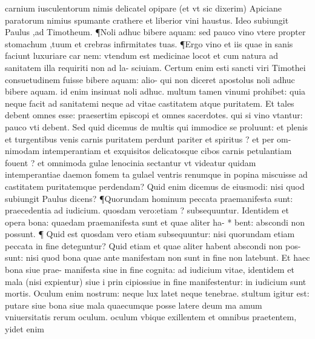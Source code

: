 \documentclass{article}
\begin{document}
\begin{pages}
carnium iusculentorum nimis delicatel opipare (et vt sic dixerim) Apiciane paratorum nimius spumante crathere et liberior vini haustus. Ideo subiungit Paulus ,ad Timotheum. ¶Noli adhuc bibere aquam: sed pauco vino vtere propter stomachum ,tuum et crebras infirmitates tuas. ¶Ergo vino et iis quae in sanis faciunt luxuriare car nem: vtendum est medicinae locot et cum natura ad sanitatem illa requiriti non ad la- sciuiam. Certum enim esti sancti viri Timothei consuetudinem fuisse bibere aquam: alio- qui non diceret apostolus noli adhuc bibere aquam. id enim insinuat noli adhuc. multum tamen vinumi prohibet: quia neque facit ad sanitatemi neque ad vitae castitatem atque puritatem. Et tales debent omnes esse: praesertim episcopi et omnes sacerdotes. qui si vino vtantur: pauco vti debent. Sed quid dicemus de multis qui immodice se proluunt: et plenis et turgentibus venis carnis puritatem perdunt pariter et spiritus ? et per om- nimodam intemperantiam et exquisitos delicatosque cibos carnis petulantiam fouent ? et omnimoda gulae lenocinia sectantur vt videatur quidam intemperantiae daemon fomem ta gulael ventris renumque in popina miscuisse ad castitatem puritatemque perdendam? Quid enim dicemus de eiusmodi: nisi quod subiungit Paulus dicens? ¶Quorundam hominum peccata praemanifesta sunt: praecedentia ad iudicium. quosdam vero:etiam ? subsequuntur. Identidem et opera bona: quaedam praemanifesta sunt et quae aliter ha- * bent: abscondi non possunt. ¶ Quid est quosdam vero etiam subsequuntur: nisi quorundam etiam peccata in fine deteguntur? Quid etiam et quae aliter habent abscondi non pos- sunt: nisi quod bona quae ante manifestam non sunt in fine non latebunt. Et haec bona siue prae- manifesta siue in fine cognita: ad iudicium vitae, identidem et mala (nisi expientur) siue i prin cipiossiue in fine manifestentur: in iudicium sunt mortis. Oculum enim nostrum: neque lux latet  neque tenebrae. stultum igitur est: putare siue bona siue mala quaecumque posse latere deum ma amum vniuersitatis rerum oculum. oculum vbique exillentem et omnibus praetentem, yidet enim  \pend

\end{pages}
\end{document}
